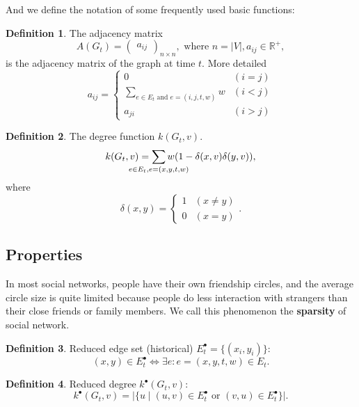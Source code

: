 \documentclass[12pt,abstract=true]{scrartcl}
\numberwithin{equation}{section}
\theoremstyle{definition}   \newtheorem{definition}{Definition}[section]
\theoremstyle{plain}        \newtheorem{theorem}{Theorem}[section]
\theoremstyle{plain}        \newtheorem{observation}{Observation}[section]
\theoremstyle{plain}        \newtheorem{fact}{Fact}[section]
\theoremstyle{plain}        \newtheorem{claim}{Claim}[section]
\theoremstyle{plain}        \newtheorem{lemma}[theorem]{Lemma}
\theoremstyle{plain}        \newtheorem{corollary}[theorem]{Corollary}
\theoremstyle{remark}       \newtheorem{example}{Example}[section]
\theoremstyle{remark}       \newtheorem{remark}{Remark}[section]
\begin{document}
And we define the notation of some frequently used basic functions:
\begin{definition}
The adjacency matrix
\begin{equation}
A(G_t)=\begin{pmatrix}a_{ij}\end{pmatrix}_{n\times n},\text{ where }n=|V|,
a_{ij}\in \mathbb{R}^+,
\end{equation}
is the adjacency matrix of the graph at time $t$. More detailed
\begin{equation}
a_{ij}=\begin{cases}
0&(i=j)\\
\sum_{e\in E_t\text{ and }e=(i,j,t,w)}w &(i<j)\\
a_{ji}&(i>j)
\end{cases}
\end{equation}
\end{definition}


\begin{definition}
The degree function $k(G_t,v)$.
\begin{equation}
k(G_t,v)=\sum_{\mathclap{e\in E_t, e=(x,y,t,w)}}w(1-\delta(x,v)\delta(y,v)),
\end{equation}
where \begin{equation}
\delta(x,y)=\begin{cases}1&(x\neq y)\\0&(x=y)\end{cases}.
\end{equation}
\end{definition}

\subsection{Properties}
In most social networks, people have their own friendship circles, and the
average circle size is quite limited because people do less interaction with
strangers than their close friends or family members. We call this phenomenon
the \textbf{sparsity} of social network.

\begin{definition}
Reduced edge set (historical) $E_t^\bullet=\{(x_i,y_i)\}$:
\begin{equation}
(x,y)\in E_t^\bullet \iff \exists e: e=(x,y,t,w)\in E_t.
\end{equation}
\end{definition}

\begin{definition}
Reduced degree $k^\bullet(G_t,v)$:
\begin{equation}
k^\bullet(G_t,v)=\Big|\{u\;|\;(u,v)\in E_t^\bullet\text{ or }(v,u)\in
E_t^\bullet\}\Big|.
\end{equation}
\end{definition}
\end{document}
